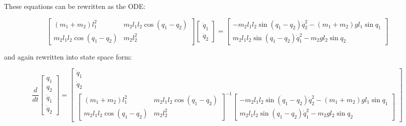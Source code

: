 These equations can be rewritten as the ODE:

\begin{equation*}
    \begin{bmatrix}
        (m_1 + m_2) l_1^2 & m_2 l_1 l_2 \cos(q_1 - q_2) \\
        m_2 l_1 l_2 \cos(q_1 - q_2) & m_2 l_2^2
    \end{bmatrix} \begin{bmatrix} \ddot{q}_1 \\ \ddot{q}_2 \end{bmatrix}
    = \begin{bmatrix} -m_2 l_1 l_2 \sin(q_1 - q_2) \dot{q}_2^2 - (m_1 + m_2) g l_1 \sin{q_1} \\ m_2 l_1 l_2 \sin(q_1 - q_2) \dot{q}_1^2 - m_2 g l_2 \sin{q_2}\end{bmatrix}
\end{equation*}

\noindent and again rewritten into state space form:

\begin{adjustwidth}{-2cm}{-2cm}
    \begin{equation}
        \frac{d}{d t} \begin{bmatrix} q_1 \\ q_2 \\ \dot{q}_1 \\ \dot{q}_2 \end{bmatrix}
        = \begin{bmatrix}
            \dot{q}_1 \\ \dot{q}_2 \\ 
            \begin{bmatrix}
                (m_1 + m_2) l_1^2 & m_2 l_1 l_2 \cos(q_1 - q_2) \\
                m_2 l_1 l_2 \cos(q_1 - q_2) & m_2 l_2^2
            \end{bmatrix}^{-1}
            \begin{bmatrix} -m_2 l_1 l_2 \sin(q_1 - q_2) \dot{q}_2^2 - (m_1 + m_2) g l_1 \sin{q_1} \\ m_2 l_1 l_2 \sin(q_1 - q_2) \dot{q}_1^2 - m_2 g l_2 \sin{q_2}\end{bmatrix}
        \end{bmatrix}
    \end{equation}
\end{adjustwidth}